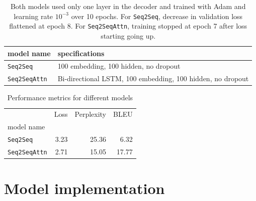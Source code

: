 \documentclass[12pt]{article}
\begin{document}
\begin{landscape}
\begin{table}[tb]
    
    \centering
\begin{tabular}{ll}
\toprule
model name                   &specifications\\
\midrule
\texttt{Seq2Seq} & 100 embedding, 100 hidden, no dropout\\
\texttt{Seq2SeqAttn} & Bi-directional LSTM, 100 embedding, 100 hidden, no dropout\\
\bottomrule
\end{tabular}
    \caption{Both models used only one layer in the decoder and trained with Adam and learning rate $10^{-3}$ over 10 epochs. For \texttt{Seq2Seq}, decrease in validation loss flattened at epoch 8. For \texttt{Seq2SeqAttn}, training stopped at epoch 7 after loss starting going up.}
    \label{tab:spec}
\end{table}
\begin{table}[h]
\centering
\begin{tabular}{lrrr}
\toprule
{}                                     & Loss  & Perplexity & BLEU \\
model name                             &       &        & \\
\midrule
\texttt{Seq2Seq}                      & 3.23 & 25.36  & 6.32 \\
\texttt{Seq2SeqAttn}                      & 2.71 & 15.05  & 17.77 \\
\bottomrule
\end{tabular}
\caption{Performance metrics for different models}
\label{table:performance}
\end{table}
\end{landscape}




\appendix
\section{Model implementation}





\end{document}
